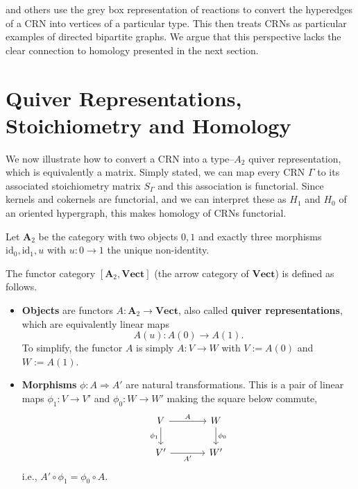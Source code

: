 \documentclass[11pt, one side, article]{memoir}
\newcommand{\define}[1]{\textbf{#1}}
\begin{document}
\cite{Baez_2017} and others use the grey box representation of reactions to convert the hyperedges of a CRN into vertices of a particular type. 
This then treats CRNs as particular examples of directed bipartite graphs.
We argue that this perspective lacks the clear connection to homology presented in the next section.

\chapter{Quiver Representations, Stoichiometry and Homology}

We now illustrate how to convert a CRN into a type--$A_2$ quiver representation, which is equivalently a matrix.
Simply stated, we can map every CRN $\Gamma$ to its associated stoichiometry matrix $S_{\Gamma}$ and this association is functorial.
Since kernels and cokernels are functorial, and we can interpret these as $H_1$ and $H_0$ of an oriented hypergraph, this makes homology of CRNs functorial.

\begin{definition}\label{defn:quiver-rep-category}
Let \(\mathbf{A}_2\) be the category with two objects \(0,1\) and exactly
three morphisms \(\mathrm{id}_0,\mathrm{id}_1,u\) with \(u:0\to 1\) the unique non-identity.

\noindent The functor category \([\mathbf{A}_2,\mathbf{Vect}]\) (the arrow category of \(\mathbf{Vect}\)) is defined as follows.
\begin{itemize}
  \item \textbf{Objects} are functors \(A:\mathbf{A}_2\to \mathbf{Vect}\), also called \define{quiver representations}, which are equivalently linear maps
  \[
    A(u):A(0)\longrightarrow A(1).
  \]
  To simplify, the functor $A$ is simply \(A:V\to W\) with \(V:=A(0)\) and \(W:=A(1)\).
  \item \textbf{Morphisms} \(\phi:A\Rightarrow A'\) are natural transformations. This is a pair of linear maps \(\phi_1:V\to V'\) and \(\phi_0:W\to W'\) making the square below commute,
  \[
  \begin{tikzcd}[column sep=large]
    V \arrow[r,"A"] \arrow[d,"\phi_1"'] &
    W \arrow[d,"\phi_0"] \\
    V' \arrow[r,"A'"'] &
    W'
  \end{tikzcd}
  \]
  i.e., $A'\circ \phi_1 = \phi_0 \circ A$.
\end{itemize}
\end{definition}
\end{document}
